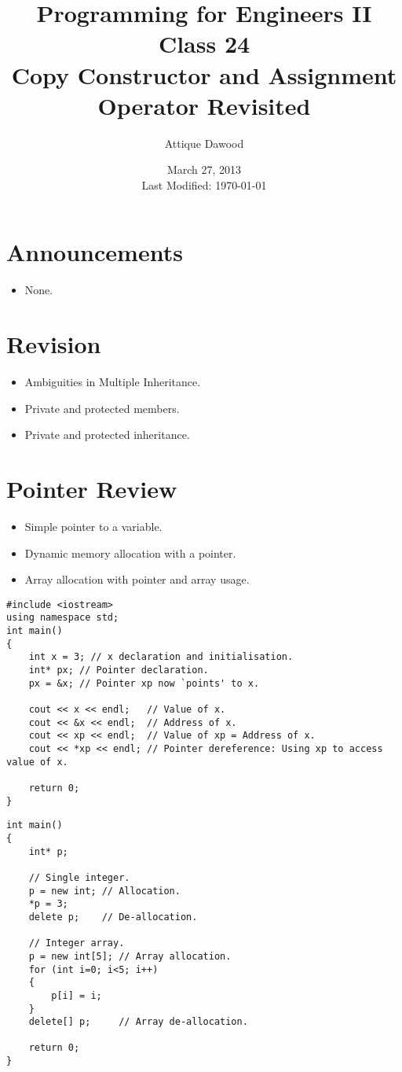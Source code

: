 \documentclass[12pt,a4paper]{article}
\title{\vspace{-2cm}Programming for Engineers II\\Class 24\\Copy Constructor and Assignment Operator Revisited}
\author{Attique Dawood}
\date{March 27, 2013\\[0.2cm] Last Modified: \today}
\begin{document}
\maketitle
\section{Announcements}
\begin{itemize}
\item None.
\end{itemize}
\section{Revision}
\begin{itemize}
\item Ambiguities in Multiple Inheritance.
\item Private and protected members.
\item Private and protected inheritance.
\end{itemize}
\section{Pointer Review}
\begin{itemize}
\item Simple pointer to a variable.
\item Dynamic memory allocation with a pointer.
\item Array allocation with pointer and array usage.
\end{itemize}
\begin{lstlisting}[caption={Pointer Basics}]
#include <iostream>
using namespace std;
int main()
{
	int x = 3; // x declaration and initialisation.
	int* px; // Pointer declaration.
	px = &x; // Pointer xp now `points' to x.
	
	cout << x << endl;   // Value of x.
	cout << &x << endl;  // Address of x.
	cout << xp << endl;  // Value of xp = Address of x.
	cout << *xp << endl; // Pointer dereference: Using xp to access value of x.
	
	return 0;
}
\end{lstlisting}
\begin{lstlisting}[caption={Dynamic memory allocation with pointer}]
int main()
{
	int* p;
	
	// Single integer.
	p = new int; // Allocation.
	*p = 3;
	delete p;    // De-allocation.
	
	// Integer array.
	p = new int[5]; // Array allocation.
	for (int i=0; i<5; i++)
	{
		p[i] = i;
	}		
	delete[] p;     // Array de-allocation.
	
	return 0;
}
\end{lstlisting}
\end{document}
